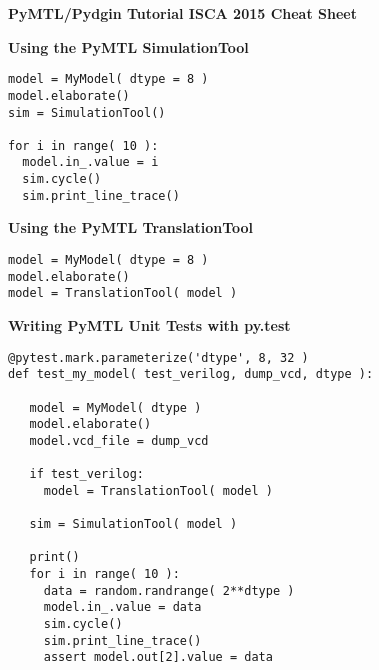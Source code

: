 \documentclass{cbxdoc}
\begin{document}
\begin{landscape}
\small

\begin{center}
  \textbf{\Large PyMTL/Pydgin
    Tutorial  \hspace{0.5em}\textbullet\hspace{0.5em}
    ISCA 2015 \hspace{0.5em}\textbullet\hspace{0.5em}
    Cheat Sheet}
\end{center}

\begin{minipage}[t]{3.25in}
\vspace{0pt}

\colorbox{gray!30!white}{\parbox{1.025\tw}{\rule[-0.4em]{0pt}{1.4em}\centering\textbf{%
  Using the PyMTL SimulationTool%
}}}

\smallskip
\begin{lstlisting}[numbers={none},xleftmargin={0.1in}]
model = MyModel( dtype = 8 )
model.elaborate()
sim = SimulationTool()

for i in range( 10 ):
  model.in_.value = i
  sim.cycle()
  sim.print_line_trace()
\end{lstlisting}

\vspace{0.15in}
\colorbox{gray!30!white}{\parbox{1.025\tw}{\rule[-0.4em]{0pt}{1.4em}\centering\textbf{%
  Using the PyMTL TranslationTool%
}}}

\smallskip
\begin{lstlisting}[numbers={none},xleftmargin={0.1in}]
model = MyModel( dtype = 8 )
model.elaborate()
model = TranslationTool( model )
\end{lstlisting}

\vspace{0.15in}
\colorbox{gray!30!white}{\parbox{1.025\tw}{\rule[-0.4em]{0pt}{1.4em}\centering\textbf{%
  Writing PyMTL Unit Tests with py.test%
}}}

\smallskip
\begin{lstlisting}[numbers={none},xleftmargin={0.1in}]
@pytest.mark.parameterize('dtype', 8, 32 )
def test_my_model( test_verilog, dump_vcd, dtype ):

   model = MyModel( dtype )
   model.elaborate()
   model.vcd_file = dump_vcd

   if test_verilog:
     model = TranslationTool( model )

   sim = SimulationTool( model )

   print()
   for i in range( 10 ):
     data = random.randrange( 2**dtype )
     model.in_.value = data
     sim.cycle()
     sim.print_line_trace()
     assert model.out[2].value = data
\end{lstlisting}


\end{minipage}
\end{landscape}
\end{document}
